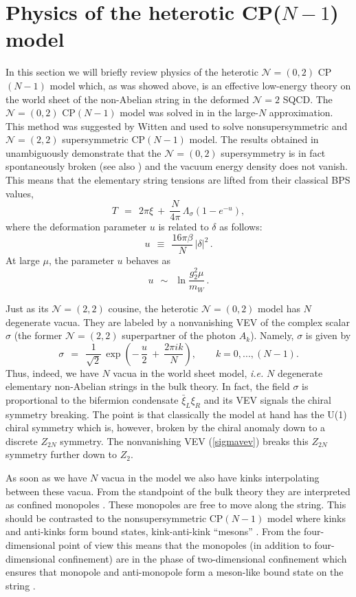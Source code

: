 \documentclass[12pt]{article}
\def\beq{\begin{equation}}
\def\eeq{\end{equation}}
\newcommand{\ntwo}{${\mathcal N}=2$ }
\newcommand{\ntwot}{${\mathcal N}= \left(2,2\right) $ }
\newcommand{\ntwoo}{${\mathcal N}= \left(0,2\right) $ }
\begin{document}
\section{Physics of the heterotic  CP({\boldmath $N-1$}) model}
\setcounter{equation}{0}
\label{largeN}

In this section we will briefly review physics of the heterotic \ntwoo  CP$(N-1)$
model which, as was showed above, is an effective low-energy theory on the world sheet 
of the non-Abelian string in the deformed \ntwo SQCD. The
 \ntwoo  CP$(N-1)$ model was solved in \cite{SYhetlN} in the  large-$N$ approximation.
This method was suggested by Witten  \cite{W79} and used to solve nonsupersymmetric
and \ntwot supersymmetric CP$(N-1)$ model. The results obtained in 
\cite{SYhetlN} unambiguously demonstrate that the  \ntwoo supersymmetry is in fact spontaneously broken
(see also \cite{Tohetdyn}) and the vacuum energy density does not vanish. This means
that the elementary string tensions  are lifted from their classical BPS values,
\beq
T~~=~~ 2\pi\xi ~+~ \frac{N}{4\pi}\,\Lambda_{\sigma}(1-e^{-u}),
\label{vacenergy}
\eeq
where the deformation parameter $u$ is related to $\delta$ as follows:
\beq
u ~~\equiv~~ \frac{16\pi\beta}{N}\,|\delta|^2\,.
\label{u}
\eeq
At large $\mu$, the  parameter $u$ behaves as 
\beq
u ~~\sim~~ \ln{\frac{g_2^2\mu}{m_W}}\,.
\eeq

Just as its \ntwot cousine, the heterotic \ntwoo model has $N$ degenerate vacua.
They are labeled by a nonvanishing VEV of the complex scalar $\sigma$ (the former \ntwot
superpartner of the photon $A_k$). Namely, $\sigma$ is given by
\beq
\sigma ~~=~~  \frac1{\sqrt{2}}\,\exp{\left(-\,\frac{u}{2}~+~\frac{2\pi i k}{N}\right)},
\qquad k=0,...,(N-1).
\label{sigmavev}
\eeq
Thus, indeed,  we have $N$ vacua  in the world sheet model, {\it i.e.} $N$ degenerate
elementary non-Abelian strings in the bulk theory. In fact, the field $\sigma$  is 
proportional
to the bifermion condensate $\bar{\xi}_L\xi_R$ and its VEV signals  the 
chiral symmetry breaking. The point is that classically the model at hand has the U(1) chiral symmetry which is, however, broken 
by the chiral anomaly down to a discrete $Z_{2N}$ symmetry. The nonvanishing VEV
(\ref{sigmavev})  breaks this $Z_{2N}$ symmetry further down to $Z_2$.

As soon as we have $N$ vacua in the model we also have kinks interpolating between
these vacua. From the standpoint  of the bulk theory they are interpreted as confined 
monopoles \cite{T,SYmon,HT2,SYnone,GSYmmodel,SYhetlN}. These monopoles are free to move
along the string. This should be contrasted to the nonsupersymmetric CP$(N-1)$ model where
kinks  and anti-kinks form bound states, kink-anti-kink
``mesons'' \cite{W79}. From the four-dimensional point of view this means that the
monopoles (in addition to four-dimensional confinement) are in the phase of  two-dimensional
confinement which ensures that monopole and anti-monopole  form a 
meson-like bound state on the string \cite{GSY05}.
\end{document}

